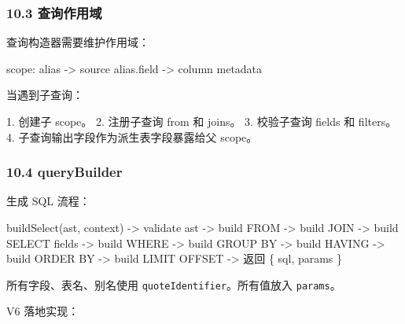 \documentclass[
  a4paper,
  UTF8]{ctexart}
\newenvironment{Shaded}{}{}
\newcommand{\NormalTok}[1]{#1}
\begin{document}
\hypertarget{ux67e5ux8be2ux4f5cux7528ux57df}{%
\subsubsection{10.3 查询作用域}\label{ux67e5ux8be2ux4f5cux7528ux57df}}

查询构造器需要维护作用域：

\begin{Shaded}
\begin{Highlighting}[]
\NormalTok{scope:}
\NormalTok{  alias {-}\textgreater{} source}
\NormalTok{  alias.field {-}\textgreater{} column metadata}
\end{Highlighting}
\end{Shaded}

当遇到子查询：

\begin{Shaded}
\begin{Highlighting}[]
\NormalTok{1. 创建子 scope。}
\NormalTok{2. 注册子查询 from 和 joins。}
\NormalTok{3. 校验子查询 fields 和 filters。}
\NormalTok{4. 子查询输出字段作为派生表字段暴露给父 scope。}
\end{Highlighting}
\end{Shaded}

\hypertarget{querybuilder}{%
\subsubsection{10.4 queryBuilder}\label{querybuilder}}

生成 SQL 流程：

\begin{Shaded}
\begin{Highlighting}[]
\NormalTok{buildSelect(ast, context)}
\NormalTok{  {-}\textgreater{} validate ast}
\NormalTok{  {-}\textgreater{} build FROM}
\NormalTok{  {-}\textgreater{} build JOIN}
\NormalTok{  {-}\textgreater{} build SELECT fields}
\NormalTok{  {-}\textgreater{} build WHERE}
\NormalTok{  {-}\textgreater{} build GROUP BY}
\NormalTok{  {-}\textgreater{} build HAVING}
\NormalTok{  {-}\textgreater{} build ORDER BY}
\NormalTok{  {-}\textgreater{} build LIMIT OFFSET}
\NormalTok{  {-}\textgreater{} 返回 \{ sql, params \}}
\end{Highlighting}
\end{Shaded}

所有字段、表名、别名使用 \texttt{quoteIdentifier}。所有值放入
\texttt{params}。

V6 落地实现：
\end{document}
